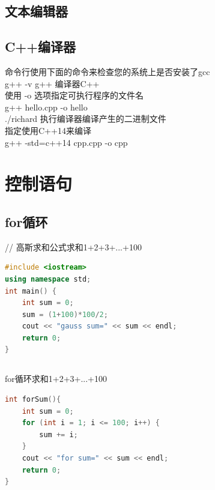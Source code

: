 \documentclass[12pt,twiside,a4paper]{ctexbook}
\numberwithin{chapter}{part}
\begin{document}
\section{文本编辑器}


\section{C++编译器}
命令行使用下面的命令来检查您的系统上是否安装了gcc\\
g++ -v
g++ 编译器C++\\
使用 -o 选项指定可执行程序的文件名\\
g++ hello.cpp -o hello\\
./richard 执行编译器编译产生的二进制文件\\
指定使用C++14来编译\\
g++ -std=c++14 cpp.cpp -o cpp 

\chapter{控制语句}
\section{for循环}
// 高斯求和公式求和1+2+3+...+100
\begin{lstlisting}[language=C++]
#include <iostream>
using namespace std;
int main() {
    int sum = 0;
    sum = (1+100)*100/2;
    cout << "gauss sum=" << sum << endl;
    return 0;
}
\end{lstlisting}

\section{}
for循环求和1+2+3+...+100\\
\begin{lstlisting}[language=C++]
int forSum(){
    int sum = 0;
    for (int i = 1; i <= 100; i++) {
        sum += i;
    }
    cout << "for sum=" << sum << endl;
    return 0;
}
\end{lstlisting}
\end{document}
